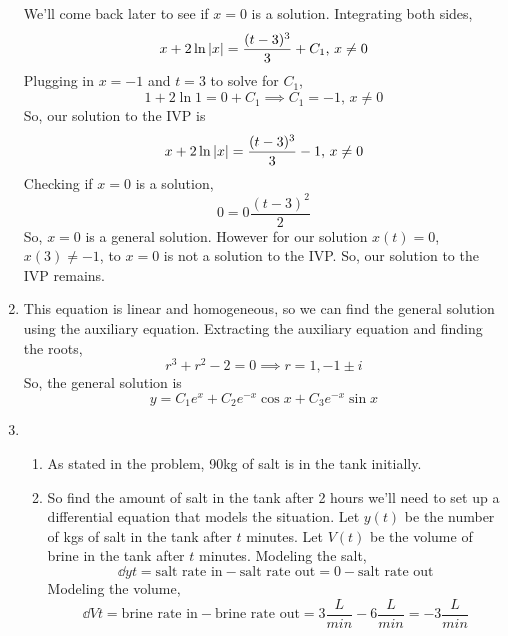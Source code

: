 \begin{enumerate}[label=\arabic*.]
\begin{equation*}
		\end{equation*}
		We'll come back later to see if $x = 0$ is a solution.
		Integrating both sides,
		\begin{equation*}
			x + 2\ln{\lvert x \rvert} = \frac{(t-3)^3}{3} + C_1 \text{, } x\neq 0
		\end{equation*}
		Plugging in $x = -1$ and $t = 3$ to solve for $C_1$,
		\begin{equation*}
			1 + 2\ln{1} = 0 + C_1 \implies C_1 = -1 \text{, } x\neq 0
		\end{equation*}
		So, our solution to the IVP is
		\begin{equation*}
			x + 2\ln{\lvert x \rvert} = \frac{(t-3)^3}{3} - 1 \text{, } x\neq 0
		\end{equation*}
		Checking if $x = 0$ is a solution,
		\begin{equation*}
			0 = 0\frac{(t-3)^2}{2}
		\end{equation*}
		So, $x = 0$ is a general solution. However for our solution $x(t) = 0$, $x(3) \neq -1$, to $x = 0$ is not a solution to the IVP. So, our solution to the IVP remains.
	\item
		This equation is linear and homogeneous, so we can find the general solution using the auxiliary equation. Extracting the auxiliary equation and finding the roots,
		\begin{equation*}
			r^3 + r^2 - 2 = 0 \implies r = 1, -1 \pm i
		\end{equation*}
		So, the general solution is
		\begin{equation*}
			y = C_1e^{x} + C_2e^{-x}\cos{x} + C_3e^{-x}\sin{x}
		\end{equation*}
	\item
		\begin{enumerate}[label=(\alph*)]
			\item
				As stated in the problem, 90kg of salt is in the tank initially.
			\item
				So find the amount of salt in the tank after 2 hours we'll need to set up a differential equation that models the situation.
				Let $y(t)$ be the number of kgs of salt in the tank after $t$ minutes. Let $V(t)$ be the volume of brine in the tank after $t$ minutes.
				Modeling the salt,
				\begin{equation*}
					\dd{y}{t} = \text{salt rate in} - \text{salt rate out} = 0 - \text{salt rate out}
				\end{equation*}
				Modeling the volume,
				\begin{equation*}
					\dd{V}{t} = \text{brine rate in} - \text{brine rate out} = 3\frac{L}{min} - 6\frac{L}{min} = -3\frac{L}{min}

\end{equation*}
\end{enumerate}
\end{enumerate}
